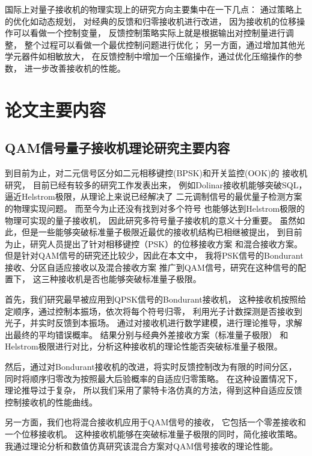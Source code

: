 国际上对量子接收机的物理实现上的研究方向主要集中在一下几点：
通过策略上的优化如动态规划\cite{dalla2014adaptive}，
对经典的反馈和归零接收机进行改进，
因为接收机的位移操作可以看做一个控制变量，
反馈控制策略实际上就是根据输出对控制量进行调整，
整个过程可以看做一个最优控制问题进行优化；
另一方面，通过增加其他光学元器件如相敏放大\cite{guha2011approaching}，
在反馈控制中增加一个压缩操作，通过优化压缩操作的参数，
进一步改善接收机的性能。




\section{论文主要内容}
\subsection{QAM信号量子接收机理论研究主要内容}
到目前为止，对二元信号区分如二元相移键控(BPSK)和开关监控(OOK)的
接收机研究，
目前已经有较多的研究工作发表出来\cite{helstrom1976quantum,kennedy1973near,dolinar1973optimum,cook2007optical}，
例如Dolinar接收机能够突破SQL，逼近Helstrom极限，从理论上来说已经解决了
二元调制信号的最优量子检测方案的物理实现问题\cite{dolinar1973optimum}。
而至今为止还没有找到对多个符号
也能够达到Helstrom极限的物理可实现的量子接收机，
因此研究多符号量子接收机的意义十分重要。
虽然如此，但是一些能够突破标准量子极限近最优的接收机结构已相继被提出，
到目前为止，研究人员提出了针对相移键控（PSK）的位移接收方案\cite{bondurant1993near,becerra2011m,izumi2012displacement}
和混合接收方案\cite{muller2012quadrature}。
但是针对QAM信号的研究还比较少，因此在本文中，
我将PSK信号的Bondurant接收、分区自适应接收以及混合接收方案
推广到QAM信号，研究在这种信号的配置下，
这三种接收机是否也能够突破标准量子极限。


首先，我们研究最早被应用到QPSK信号的Bondurant接收机，
这种接收机按照给定顺序，通过控制本振场，依次将每个符号归零，
利用光子计数探测是否接收到光子，并实时反馈到本振场。
通过对接收机进行数学建模，进行理论推导，求解出最终的平均错误概率。
结果分别与经典外差接收方案（标准量子极限）
和Helstrom极限进行对比，分析这种接收机的理论性能否突破标准量子极限。

然后，通过对Bondurant接收机的改进，将实时反馈控制改为有限的时间分区，
同时将顺序归零改为按照最大后验概率的自适应归零策略。
在这种设置情况下，理论推导过于复杂，
所以我们采用了蒙特卡洛仿真的方法，得到这种自适应反馈控制接收机的性能曲线。

另一方面，我们也将混合接收机应用于QAM信号的接收，
它包括一个零差接收和一个位移接收机。
这种接收机能够在突破标准量子极限的同时，简化接收策略。
我通过理论分析和数值仿真研究该混合方案对QAM信号接收的理论性能。

